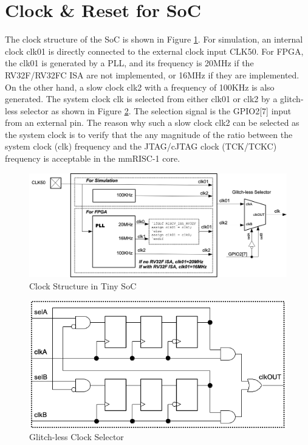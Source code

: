 \section{Clock \& Reset for SoC}
\label{sec:CLOCKRESETSOC}

The clock structure of the SoC is shown in Figure \ref{fig:CLOCKSOC}. For simulation, an internal clock clk01 is directly connected to the external clock input CLK50. For FPGA, the clk01 is generated by a PLL, and its frequency is 20MHz if the RV32F/RV32FC ISA are not implemented, or 16MHz if they are implemented. On the other hand, a slow clock clk2 with a frequency of 100KHz is also generated. The system clock clk is selected from either clk01 or clk2 by a glitch-less selector as shown in Figure \ref{fig:GLITCHLESSSELECTOR}. The selection signal is the GPIO2[7] input from an external pin. The reason why such a slow clock clk2 can be selected as the system clock is to verify that the any magnitude of the ratio between the system clock (clk) frequency and the JTAG/cJTAG clock (TCK/TCKC) frequency is acceptable in the mmRISC-1 core.

\begin{figure}[H]
    \includegraphics[width=1.00\columnwidth]{./Figure/ClockSoC.png}
    \caption{Clock Structure in Tiny SoC}
    \label{fig:CLOCKSOC}
\end{figure}

\begin{figure}[H]
    \includegraphics[width=0.6\columnwidth]{./Figure/GlitchlessSelector.png}
    \caption{Glitch-less Clock Selector}
    \label{fig:GLITCHLESSSELECTOR}
\end{figure}

